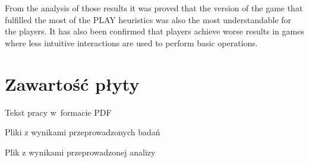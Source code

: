 \documentclass[a4paper,12pt,numbers=noenddot]{report}
\begin{document}
From the analysis of those results it was proved that the version of the game that fulfilled the most of the PLAY heuristics was also the most understandable for the players. It has also been confirmed that players achieve worse results in games where less intuitive interactions are used to perform basic operations.

 
%

\renewcommand{\listoffigures}{\begingroup
\tocchapter
{}
\endgroup}
\listoffigures
\chapter{Zawartość płyty}
\begin{enumerate}[label={[\arabic*]}]
  \item Tekst pracy w~formacie PDF
  \item Pliki z wynikami przeprowadzonych badań
  \item Plik z wynikami przeprowadzonej analizy
\end{enumerate}
\end{document}

